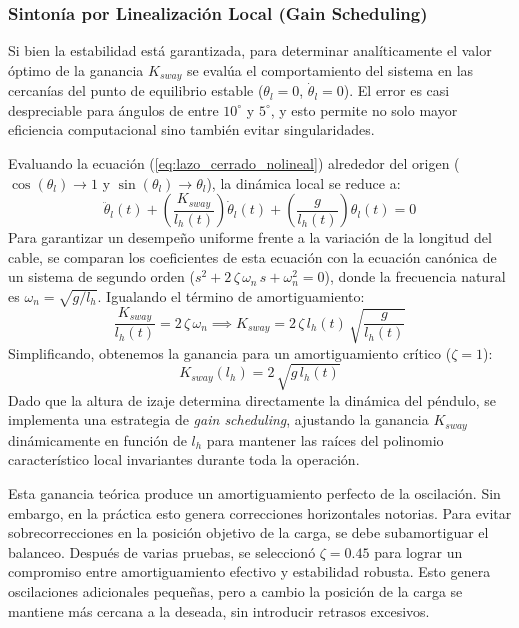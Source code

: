 \documentclass[11pt]{article}                                    %
\begin{document}
\subsubsection{Sintonía por Linealización Local (Gain Scheduling)}
Si bien la estabilidad está garantizada, para determinar analíticamente el valor óptimo de la ganancia $K_{sway}$ se evalúa el comportamiento del sistema en las cercanías del punto de equilibrio estable ($\theta_l = 0$, $\dot{\theta}_l = 0$). El error es casi despreciable para ángulos de entre $10^\circ$ y $5^\circ$, y esto permite no solo mayor eficiencia computacional sino también evitar singularidades.

Evaluando la ecuación (\ref{eq:lazo_cerrado_nolineal}) alrededor del origen ($\cos(\theta_l) \to 1$ y $\sin(\theta_l) \to \theta_l$), la dinámica local se reduce a:
\begin{equation}
    \ddot{\theta}_l(t) + \left( \frac{K_{sway}}{l_h(t)} \right) \dot{\theta}_l(t) + \left( \frac{g}{l_h(t)} \right) \theta_l(t) = 0
\end{equation}
Para garantizar un desempeño uniforme frente a la variación de la longitud del cable, se comparan los coeficientes de esta ecuación con la ecuación canónica de un sistema de segundo orden ($s^2 + 2\,\zeta\,\omega_n \,s + \omega_n^2 = 0$), donde la frecuencia natural es $\omega_n = \sqrt{g/l_h}$. Igualando el término de amortiguamiento:
\begin{equation}
    \frac{K_{sway}}{l_h(t)} = 2 \, \zeta \, \omega_n \implies K_{sway} = 2 \, \zeta \, l_h(t) \, \sqrt{\frac{g}{l_h(t)}}
\end{equation}
Simplificando, obtenemos la ganancia para un amortiguamiento crítico ($\zeta = 1$):
\begin{equation}
    K_{sway}(l_h) = 2 \,\sqrt{g \, l_h(t)}
\end{equation}
Dado que la altura de izaje determina directamente la dinámica del péndulo, se implementa una estrategia de \textit{gain scheduling}, ajustando la ganancia $K_{sway}$ dinámicamente en función de $l_h$ para mantener las raíces del polinomio característico local invariantes durante toda la operación.

Esta ganancia teórica produce un amortiguamiento perfecto de la oscilación. Sin embargo, en la práctica esto genera correcciones horizontales notorias. Para evitar sobrecorrecciones en la posición objetivo de la carga, se debe subamortiguar el balanceo. Después de varias pruebas, se seleccionó $\zeta = 0.45$ para lograr un compromiso entre amortiguamiento efectivo y estabilidad robusta. Esto genera oscilaciones adicionales pequeñas, pero a cambio la posición de la carga se mantiene más cercana a la deseada, sin introducir retrasos excesivos.
\end{document}

